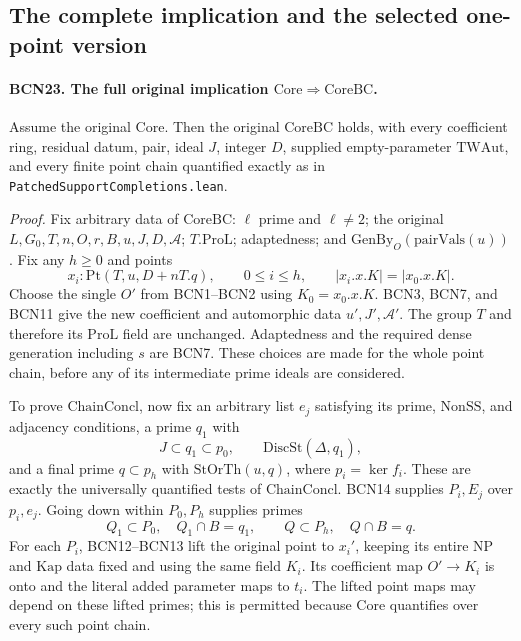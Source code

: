 \subsection{The complete implication and the selected one-point version}

\paragraph{BCN23. The full original implication
\(\mathrm{Core}\Rightarrow\mathrm{CoreBC}\).}\label{claim:BCN23}
Assume the original \(\mathrm{Core}\).
Then the original \(\mathrm{CoreBC}\) holds, with every
coefficient ring, residual datum, pair, ideal \(J\),
integer \(D\), supplied empty-parameter \(\mathrm{TWAut}\),
and every finite point chain quantified exactly as in
\texttt{PatchedSupportCompletions.lean}.

\emph{Proof.}
Fix arbitrary data of \(\mathrm{CoreBC}\):
\(\ell\) prime and \(\ell\ne2\); the original
\(L,G_0,T,n,O,r,B,u,J,D,\mathcal A\);
\(T.\mathrm{ProL}\); adaptedness; and
\(\mathrm{GenBy}_O(\mathrm{pairVals}(u))\).
Fix any \(h\ge0\) and points
\[
 x_i:\mathrm{Pt}(T,u,D+nT.q),\qquad 0\le i\le h,
 \qquad |x_i.x.K|=|x_0.x.K| .                                  \tag{BCN.47}
\]
Choose the single \(O'\) from BCN1--BCN2 using \(K_0=x_0.x.K\).
BCN3, BCN7, and BCN11 give the new coefficient and
automorphic data \(u',J',\mathcal A'\).
The group \(T\) and therefore its \(\mathrm{ProL}\) field
are unchanged.  Adaptedness and the required dense
generation including \(s\) are BCN7.
These choices are made for the whole point chain,
before any of its intermediate prime ideals are considered.

To prove \(\mathrm{ChainConcl}\), now fix an arbitrary
list \(e_j\) satisfying its prime, \(\mathrm{NonSS}\),
and adjacency conditions, a prime \(q_1\) with
\[
 J\subset q_1\subset p_0,\qquad
 \mathrm{DiscSt}(\Delta,q_1),
\]
and a final prime \(q\subset p_h\) with
\(\mathrm{StOrTh}(u,q)\), where \(p_i=\ker f_i\).
These are exactly the universally quantified tests of
\(\mathrm{ChainConcl}\).
BCN14 supplies \(P_i,E_j\) over \(p_i,e_j\).
Going down within \(P_0,P_h\) supplies primes
\[
 Q_1\subset P_0,\quad Q_1\cap B=q_1,\qquad
 Q\subset P_h,\quad Q\cap B=q .
\]
For each \(P_i\), BCN12--BCN13 lift the original point
to \(x_i'\), keeping its entire \(\mathrm{NP}\) and
\(\mathrm{Kap}\) data fixed and using the same field \(K_i\).
Its coefficient map \(O'\to K_i\) is onto and the
literal added parameter maps to \(t_i\).
The lifted point maps may depend on these lifted primes;
this is permitted because \(\mathrm{Core}\) quantifies
over every such point chain.

